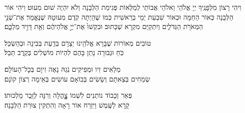 וִיהִי רָצוֹן מִלְּפָנֶֽיךָ יְיָ אֱלֹהַי וֵאלֹהֵי אֲבוֹתַי לְמַלְּאוֹת פְּגִימַת הַלְּבָנָה וְלֹא יִהְיֶה שׁוּם מִעוּט׃ וִיהִי אוֹר הַלְּבָנָה כְּאוֹר הַחַמָּה וּכְאוֹר שִׁבְעַת יְמֵי בְרֵאשִׁית כְּמוֹ שֶׁהָיְתָה קֹֽדֶם מִעוּטָהּ שֶׁנֶּאֱמַר׃
אֶת־שְׁנֵ֥י הַמְּאֹרֹ֖ת הַגְּדֹלִ֑ים
וְיִתְקַיַּם מִקְרָא שֶׁכָּתוּב׃ 
וּבִקְשׁוּ֙ אֶת־יְיָ֣ אֱלֹהֵיהֶ֔ם וְאֵ֖ת דָּוִ֣יד מַלְכָּ֑ם׃

\lamenatzeachbinginot

\aleinu

\mournerskaddish

טוֹבִים מְאוֹרוֹת שֶׁבָּרָא אֱלֹהֵֽינוּ \hfill יְצָרָם בְּדַֽעַת בְּבִינָה וּבְהַשְׂכֵּל׃\\
כֹּֽחַ וּגְבוּרָה נָתַן בָּהֶם \hfill לִהְיוֹת מוֹשְׁלִים בְּקֶֽרֶב תֵּבֵל׃

מְלֵאִים זִיו וּמְפִיקִים נֹֽגַהּ \hfill נָאֶה זִיוָם בְּכׇל־הָעוֹלָם׃ \\
שְׂמֵחִים בְּצֵאתָם וְשָׂשִׂים בְּבוֹאָם \hfill עוֹשִׂים בְּאֵימָה רְצוֹן קוׂנָם׃

פְּאֵר וְכָבוֹד נוֹתְנִים לִשְׁמוֹ \hfill צׇׇׇׇׇהֳלָה וְרִנָּה לְזֵֽכֶר מַלְכוּתוֹ׃ \\
קָרָא לַשֶּֽׁמֶשׁ וַיִּזְרַח אוֹר \hfill רָאָה וְהִתְקִין צוּרַת הַלְּבָנָה׃\\